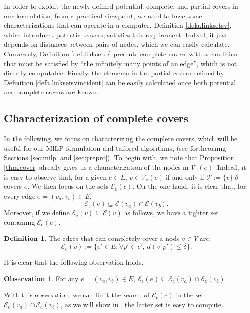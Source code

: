 \documentclass[review]{elsarticle}
\newcommand{\cE}{{\mathcal E}}
\newcommand{\cP}{{\mathcal P}}
\newcommand{\cV}{{\mathcal V}}
\newcommand{\dlt}{{\delta}}
\theoremstyle{definition}
\newtheorem{definition}{Definition}[section]
\newtheorem{observation}{Observation}[section]
\begin{document}
In order to exploit the newly defined potential, complete, and partial covers in our formulation, from a practical viewpoint, we need to have some characterizations that can operate in a computer. Definition \ref{defa.linksetsv}, which introduces potential covers, satisfies this requirement. Indeed, it just depends on distances between pairs of nodes, which we can easily calculate. Conversely, Definition \ref{def.linksetse} presents complete covers with a condition that must be satisfied by ``the infinitely many points of an edge'', which is not directly computable. Finally, the elements in the partial covers defined by Definition \ref{defa.linksetsvincident} can be easily calculated once both potential and complete covers are known.

\subsection{Characterization of complete covers}

In the following, we focus on characterizing the complete covers, which will be useful for our MILP formulation and tailored algorithms, (see forthcoming Sections \ref{sec:milp} and \ref{sec:prepro}). To begin with, we note that Proposition \ref{thm.cover} already gives us a characterization of the nodes in $\cV_{\mathrm{c}}(e)$. Indeed, it is easy to observe that, for a given $e\in E$, $v\in \cV_{\mathrm{c}}(e)$ if and only if $\cP:=\{v\}$ $\dlt$-covers $e$. We then focus on the sets $\cE_{\mathrm{c}}(e)$. On the one hand, it is clear that, for every edge $e=(v_a,v_b)\in E$,
$$\cE_{\mathrm{c}}(e)\subseteq \cE(v_a)\cap \cE(v_b).$$
Moreover, if we define $\cE_{\mathrm{c}}(v)\subseteq \cE(v)$ as follows, we have a tighter set containing $\cE_{\mathrm{c}}(e)$.
\begin{definition}\label{def.cEc}
The edges that can completely cover a node $v \in V$ are:
$$\cE_{\mathrm{c}}(v) :=\{e' \in E:   \forall p' \in e',\:   d(v,p') \le \dlt\}.$$
\end{definition}

It is clear that the following observation holds.
\begin{observation}\label{obser}
For any $e=(v_a,v_b)\in E$, $\cE_{\mathrm{c}}(e)\subseteq \cE_{\mathrm{c}}(v_a)\cap \cE_{\mathrm{c}}(v_b)$.
\end{observation}
With this observation, we can limit the search of $\cE_{\mathrm{c}}(e)$ in the set $\cE_{\mathrm{c}}(v_a)\cap \cE_{\mathrm{c}}(v_b)$, as we will show in , the latter set is easy to compute.
\end{document}
